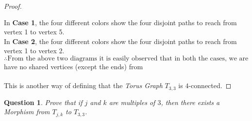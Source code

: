\documentclass{article}
\newtheorem{question}{Question}
\begin{document}
\begin{proof}
\begin{center}
\end{center}
    In \textbf{Case 1}, the four different colors show the four disjoint paths to reach from vertex 1 to vertex 5.\\
    In \textbf{Case 2}, the four different colors show the four disjoint paths to reach from vertex 1 to vertex 2.\\

    $\therefore \text{From the above two diagrams it is easily observed that in both the cases, we are able to get four different paths that }$
    have no shared vertices (except the ends) from
    \\
    \\This is another way of defining that the \textit{Torus Graph} $T_{3,3}$ is $4$-connected.
\end{proof}
\begin{question}
   Prove that if $j$ and $k$ are multiples of $3$, then there exists a Morphism from $T_{j,k}$ to $T_{3,3}$.
\end{question}
\end{document}

